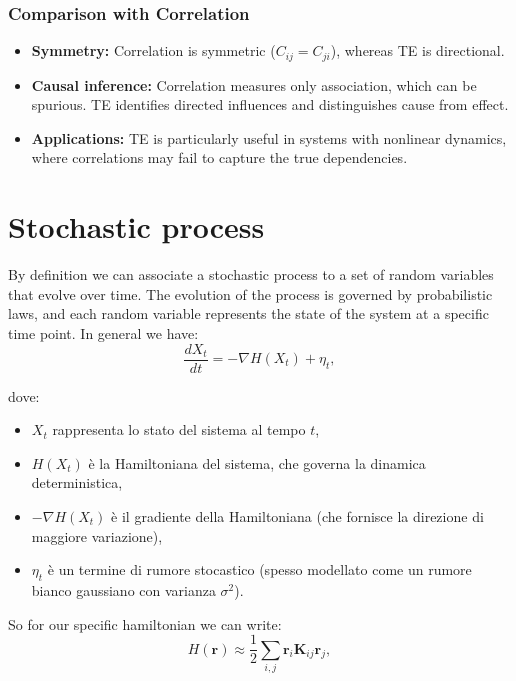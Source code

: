 \documentclass[English, Lau, oneside]{sapthesis}
\begin{document}
\begin{itemize}
\subsection*{Comparison with Correlation}
\begin{itemize}
    \item \textbf{Symmetry:} Correlation is symmetric (\(C_{ij} = C_{ji}\)), whereas TE is directional.
    \item \textbf{Causal inference:} Correlation measures only association, which can be spurious. TE identifies directed influences and distinguishes cause from effect.
    \item \textbf{Applications:} TE is particularly useful in systems with nonlinear dynamics, where correlations may fail to capture the true dependencies.
\end{itemize}






\chapter{Stochastic process}
By definition we can associate a stochastic process to a set of random variables that evolve over time. 
The evolution of the process is governed by probabilistic laws, and each random variable represents the state of the system at a specific time point. 
In general we have:
\begin{equation}
    \frac{dX_t}{dt} = -\nabla H(X_t) + \eta_t,
    \end{equation}
    
dove:
\begin{itemize}
    \item \( X_t \) rappresenta lo stato del sistema al tempo \( t \),
    \item \( H(X_t) \) è la Hamiltoniana del sistema, che governa la dinamica deterministica,
    \item \( -\nabla H(X_t) \) è il gradiente della Hamiltoniana (che fornisce la direzione di maggiore variazione),
    \item \( \eta_t \) è un termine di rumore stocastico (spesso modellato come un rumore bianco gaussiano con varianza \( \sigma^2 \)).
\end{itemize}
So for our specific hamiltonian we can write:
\begin{equation}
H(\mathbf{r}) \approx \frac{1}{2} \sum_{i,j} \mathbf{r}_i \mathbf{K}_{ij} \mathbf{r}_j,
\end{equation}


\end{itemize}
\end{document}
